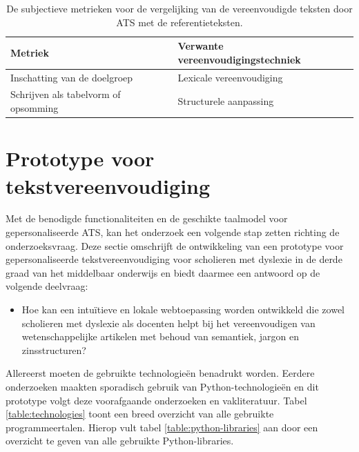 \begin{center}
	\begin{table}[H]
		\begin{tabular}{ | m{7cm} | m{7cm} | } 
			\hline
			\textbf{Metriek} & \textbf{Verwante vereenvoudigingstechniek} \\
			\hline
			Inschatting van de doelgroep & Lexicale vereenvoudiging \\
			\hline
			Schrijven als tabelvorm of opsomming & Structurele aanpassing \\
			\hline
		\end{tabular}
	\caption{De subjectieve metrieken voor de vergelijking van de vereenvoudigde teksten door ATS met de referentieteksten.}
	\label{table:verg-studie-reftekst-metrieken}
	\end{table}
\end{center}

\section{Prototype voor tekstvereenvoudiging}

Met de benodigde functionaliteiten en de geschikte taalmodel voor gepersonaliseerde ATS, kan het onderzoek een volgende stap zetten richting de onderzoeksvraag. Deze sectie omschrijft de ontwikkeling van een prototype voor gepersonaliseerde tekstvereenvoudiging voor scholieren met dyslexie in de derde graad van het middelbaar onderwijs en biedt daarmee een antwoord op de volgende deelvraag: 

\begin{itemize}
	\item Hoe kan een intuïtieve en lokale webtoepassing worden ontwikkeld die zowel scholieren met dyslexie als docenten helpt bij het vereenvoudigen van wetenschappelijke artikelen met behoud van semantiek, jargon en zinsstructuren?
\end{itemize}

Allereerst moeten de gebruikte technologieën benadrukt worden. Eerdere onderzoeken maakten sporadisch gebruik van Python-technologieën en dit prototype volgt deze voorafgaande onderzoeken en vakliteratuur. Tabel \ref{table:technologies} toont een breed overzicht van alle gebruikte programmeertalen. Hierop vult tabel \ref{table:python-libraries} aan door een overzicht te geven van alle gebruikte Python-libraries.

